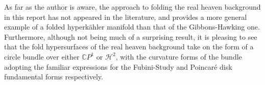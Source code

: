 \documentclass[a4paper,12pt, onecolumn, notitlepage]{article}
\theoremstyle{definition}
\theoremstyle{remark}
\newcommand{\HK}{hyperk\"ahler }
\begin{document}
As far as the author is aware, the approach to folding the real heaven background in this report has not appeared in the literature, and provides a more general example of a folded \HK manifold than that of the Gibbons-Hawking one. Furthermore, although not being much of a surprising result, it is pleasing to see that the fold hypersurfaces of the real heaven background take on the form of a circle bundle over either $\mathbb{C}P^{1}$ or $\mathcal{H}^{2}$, with the curvature forms of the bundle adopting the familiar expressions for the Fubini-Study and Poincar\'e disk fundamental forms respectively. 


 

	
\end{document}
